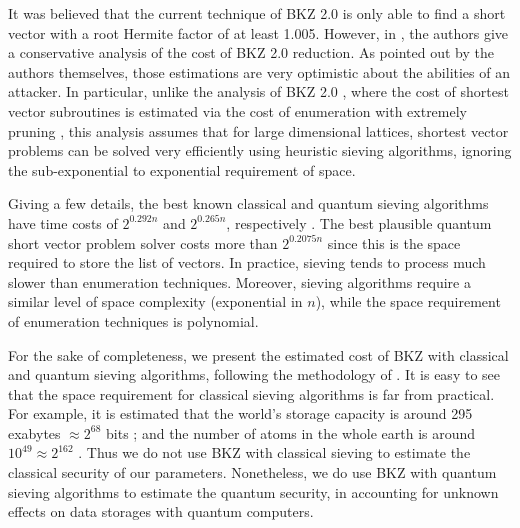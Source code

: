 \documentclass{llncs}
\newcommand{\<}{\langle}
\renewcommand{\>}{\rangle}
\begin{document}
It was believed that the current
technique of BKZ 2.0 \cite{BKZ2} is only able to find a short vector
with a root Hermite factor of at least 1.005. %
However, in \cite{newhope}, the authors give a conservative analysis of the cost of BKZ 2.0 reduction. As pointed out by the
authors themselves, those estimations are very optimistic about the abilities of an attacker. In particular, unlike
the analysis of BKZ 2.0 \cite{BKZ2}, where the cost of shortest vector subroutines is estimated via the cost of
enumeration with extremely pruning \cite{GNR10}, this analysis assumes that for large dimensional lattices, shortest vector problems can be
solved very efficiently using heuristic sieving algorithms, ignoring the
sub-exponential to exponential requirement of space. %

Giving a few details, the best known classical and quantum sieving algorithms have time costs of $2^{0.292n}$ and $2^{0.265n}$, respectively \cite{DBLP:journals/iacr/BaiLS16}. The best plausible quantum short vector problem solver costs more than $2^{0.2075n}$ since this is 
the space required to store the list of vectors.
In practice, sieving tends to process much slower than enumeration techniques. Moreover, sieving algorithms require a similar level of space complexity
(exponential in $n$), while the space requirement of enumeration techniques is polynomial. 

For the sake of completeness, we present the estimated cost
of BKZ with classical and quantum sieving algorithms, 
following the methodology of \cite{newhope}. It is easy
to see that the space requirement for classical sieving
algorithms is far from practical. For example, it is estimated
that the world's storage capacity is around 295 exabytes 
$\approx 2^{68}$ bits \cite{storage1}; and the number of
atoms in the whole earth is around $10^{49}\approx 2^{162}$ \cite{atom}. Thus we do not use BKZ with classical sieving
to estimate the classical security of our parameters.
Nonetheless, we do use BKZ with quantum sieving algorithms
to estimate the quantum security, in accounting for 
unknown effects on data storages with quantum computers.
\end{document}
